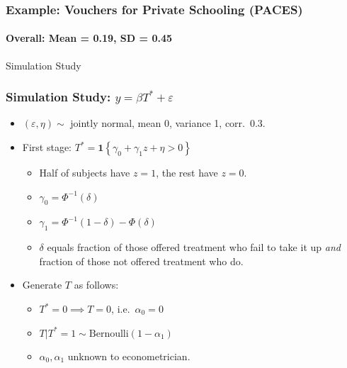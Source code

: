 \documentclass{beamer}
\begin{document}
\begin{frame}
  \frametitle{Example: Vouchers for Private Schooling (PACES)}
  \framesubtitle{Overall: Mean = 0.19, SD = 0.45}
\begin{figure}[h]
  \scriptsize
  \begingroup
  \centering
  
  \endgroup
\end{figure}
\end{frame}
\begin{frame}
  \begin{center}
    \Huge Simulation Study
  \end{center}
\end{frame}
\begin{frame}
  \frametitle{Simulation Study: $y = \beta T^* + \varepsilon$}
  \begin{itemize}
    \item $(\varepsilon, \eta) \sim $ jointly normal, mean 0, variance 1, corr.\ 0.3.
    \item First stage: $T^* = \mathbf{1}\left\{ \gamma_0 + \gamma_1 z + \eta > 0 \right\}$
      \begin{itemize}
        \item Half of subjects have $z=1$, the rest have $z=0$.
        \item $\gamma_0 = \Phi^{-1}(\delta)$
        \item $\gamma_1 = \Phi^{-1}(1-\delta) - \Phi(\delta)$   
        \item $\delta$ equals fraction of those offered treatment who fail to take it up \emph{and} fraction of those not offered treatment who do.
      \end{itemize}
    \item Generate $T$ as follows:
      \begin{itemize}
        \item $T^* = 0 \implies T=0$, i.e.\ $\alpha_0 = 0$
        \item $T|T^*=1 \sim \mbox{Bernoulli}(1-\alpha_1)$
        \item $\alpha_0, \alpha_1$ unknown to econometrician.
      \end{itemize}
  \end{itemize}

  
\end{frame}
\end{document}
